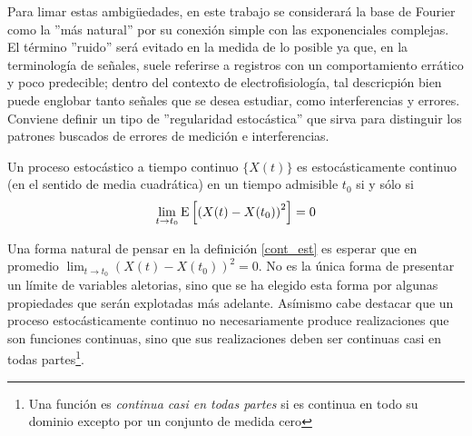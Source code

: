 Para limar estas ambig\"uedades, en este trabajo se considerar\'a la base de Fourier como la
''m\'as natural'' por su conexi\'on simple con las exponenciales complejas. El t\'ermino
''ruido'' ser\'a evitado en la medida de lo posible ya que, en la terminolog\'ia de se\~nales,
suele referirse a registros con un comportamiento err\'atico y poco
predecible; dentro del contexto de electrofisiolog\'ia, tal descricpi\'on bien
puede englobar tanto
se\~nales que
se desea estudiar, como interferencias y errores.
Conviene definir
un tipo de ''regularidad estoc\'astica'' que sirva para distinguir los patrones buscados
de errores de medici\'on e interferencias.

\begin{defn}
Un proceso estoc\'astico a tiempo continuo $\{ X(t) \}$ es estoc\'asticamente continuo
(en el sentido de media cuadr\'atica)
en un tiempo admisible $t_0$ si y s\'olo si
\begin{equation*}
\lim_{t \rightarrow t_0} \mathrm{E}\left[ \left( X(t) - X(t_0) \right)^{2} \right] = 0
\end{equation*}
\label{cont_est}
\end{defn}

Una forma natural de pensar en la definici\'on \ref{cont_est} es esperar que en promedio
$\lim_{t \rightarrow t_0} \left( X(t) - X(t_0) \right)^{2} = 0$. 
No es la \'unica forma de presentar un l\'imite de variables aletorias, sino que se ha elegido
esta forma por algunas propiedades que ser\'an explotadas m\'as adelante. 
As\'imismo cabe destacar que un proceso estoc\'asticamente continuo no necesariamente produce 
realizaciones que son funciones continuas, sino que sus realizaciones deben ser continuas 
casi en todas partes\footnote{Una funci\'on es \textit{continua casi en todas partes} si
es continua en todo su dominio excepto por un conjunto de medida cero}.


